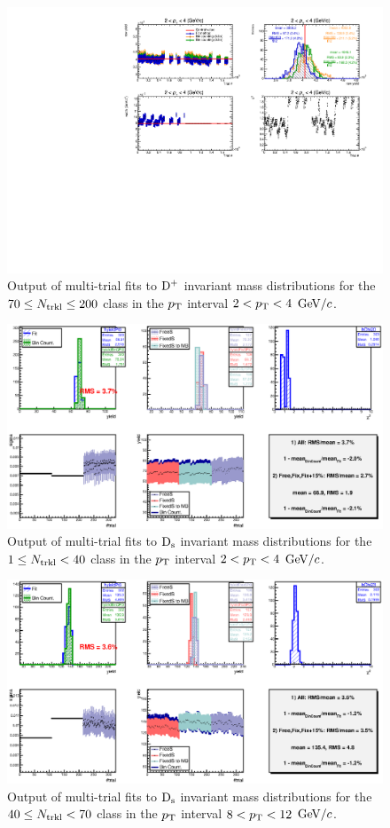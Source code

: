 \begin{figure}[htpb]
\centering
 \includegraphics[width=.9\textwidth]{FigCap6/RawYieldsSyst_Central_d0cut_Ntrklts_70_200_pt0.pdf}
 \caption{Output of multi-trial fits to ${\rm D^+}$ invariant mass distributions for the $70 \leq N_{\rm trkl} \leq 200$ class in the $p_{\rm T}$ interval $ 2 < p_{\rm T} < 4$ $\mathrm{GeV}/c$.}
 \label{fig:DplusMultiTrial_3}
\end{figure}

 \begin{figure}[htpb]
\centering
 \includegraphics[width=.9\textwidth]{FigCap6/MT_Pt0_140.eps}
 \caption{Output of multi-trial fits to ${\rm D_s}$ invariant mass distributions for the $1 \leq N_{\rm trkl} < 40$ class in the $p_{\rm T}$ interval $ 2 < p_{\rm T} < 4$ $\mathrm{GeV}/c$.}
 \label{fig:DplusMultiTrial_1}
\end{figure}

 \begin{figure}[htpb]
\centering
 \includegraphics[width=.9\textwidth]{FigCap6/MT_Pt3_4070.eps}
 \caption{Output of multi-trial fits to ${\rm D_s}$ invariant mass distributions for the $40 \leq N_{\rm trkl} < 70$ class in the $p_{\rm T}$ interval $  8< p_{\rm T} < 12$ $\mathrm{GeV}/c$.}
 \label{fig:DplusMultiTrial_2}
\end{figure}

